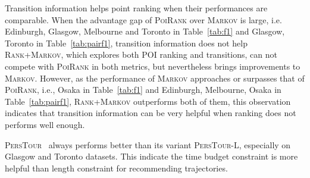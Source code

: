Transition information helps point ranking when their performances are comparable.
When the advantage gap of \textsc{PoiRank} over \textsc{Markov} is large,
i.e. Edinburgh, Glasgow, Melbourne and Toronto in Table~\ref{tab:f1} and Glasgow, Toronto in Table~\ref{tab:pairf1},
transition information does not help \textsc{Rank+Markov}, which explores both POI ranking and transitions,
can not compete with \textsc{PoiRank} in both metrics, but nevertheless brings improvements to \textsc{Markov}.
However, as the performance of \textsc{Markov} approaches or surpasses that of \textsc{PoiRank},
i.e., Osaka in Table~\ref{tab:f1} and Edinburgh, Melbourne, Osaka in Table~\ref{tab:pairf1},
\textsc{Rank+Markov} outperforms both of them, this observation indicates that transition information can be very helpful when
ranking does not performs well enough.


\textsc{PersTour}~\cite{ijcai15} always performs better than its variant \textsc{PersTour-L},
especially on Glasgow and Toronto datasets.
This indicate the time budget constraint is more helpful than length constraint for recommending trajectories.

